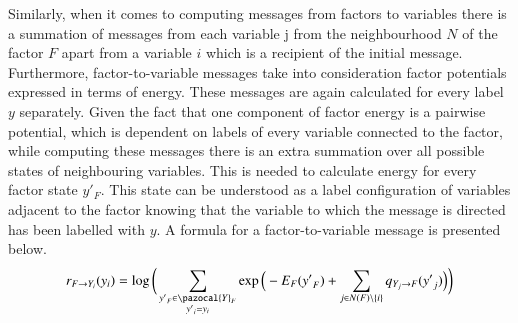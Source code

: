 Similarly, when it comes to computing messages from factors to variables there is a summation of messages from each variable j from the neighbourhood $N$ of the factor $F$ apart from a variable $i$ which is a recipient of the initial message. Furthermore, factor-to-variable messages take into consideration factor potentials expressed in terms of energy. These messages are again calculated for every label $y$ separately. Given the fact that one component of factor energy is a pairwise potential, which is dependent on labels of every variable connected to the factor, while computing these messages there is an extra summation over all possible states of neighbouring variables. This is needed to calculate energy for every factor state $y'_F$. This state can be understood as a label configuration of variables adjacent to the factor knowing that the variable to which the message is directed has been labelled with $y$. A formula for a factor-to-variable message is presented below. 
\begin{equation}
    r_{F\rightarrow Y_i}(y_i) = \log{\bigg(
        \sum_{\substack{{y'}_{F}\in \pazocal{Y}_F                              \\ {y'}_i = y_i}}
        \exp{\Big(-{E_F}({y'}_F) +
        \sum_{j \in N (F) \setminus \left \{ i \right \}}
            {q_{Y_j\rightarrow F}({y'}_j)}
    \Big)} \bigg)}
\end{equation}

